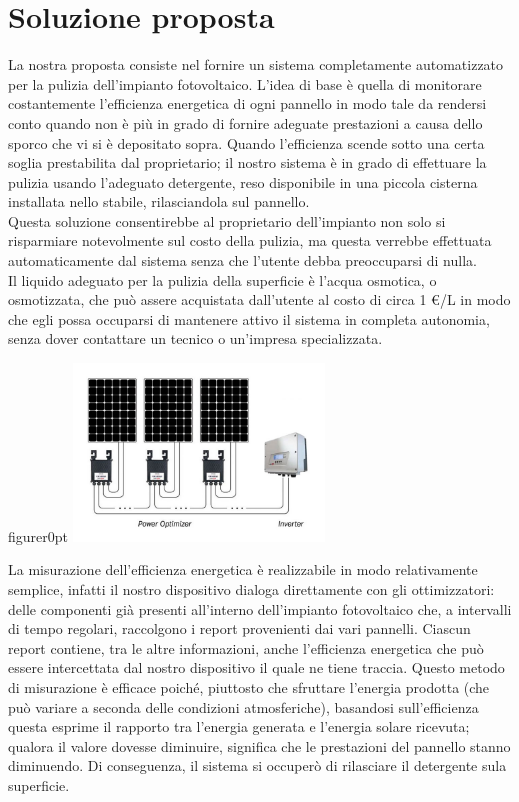 \documentclass[a4paper, 12pt]{article}
\begin{document}
	\section{Soluzione proposta}
	La nostra proposta consiste nel fornire un sistema completamente automatizzato per la pulizia dell'impianto fotovoltaico. L'idea di base è quella di monitorare costantemente l'efficienza energetica di ogni pannello in modo tale da rendersi conto quando non è più in grado di fornire adeguate prestazioni a causa dello sporco che vi si è depositato sopra. Quando l'efficienza scende sotto una certa soglia prestabilita dal proprietario; il nostro sistema è in grado di effettuare la pulizia usando l'adeguato detergente, reso disponibile in una piccola cisterna installata nello stabile, rilasciandola sul pannello.\\
	Questa soluzione consentirebbe al proprietario dell'impianto non solo si risparmiare notevolmente sul costo della pulizia, ma questa verrebbe effettuata automaticamente dal sistema senza che l'utente debba preoccuparsi di nulla.\\
	Il liquido adeguato per la pulizia della superficie è l'acqua osmotica, o osmotizzata, che può assere acquistata dall'utente al costo di circa 1 \euro/L in modo che egli possa occuparsi di mantenere attivo il sistema in completa autonomia, senza dover contattare un tecnico o un'impresa specializzata.\\
	\begin{wrapfloat}{figure}{r}{0pt}
		\includegraphics[width=0.5\textwidth]{Images/ottimizzatori.jpg}
	\end{wrapfloat}
	La misurazione dell'efficienza energetica è realizzabile in modo relativamente semplice, infatti il nostro dispositivo dialoga direttamente con gli ottimizzatori: delle componenti già presenti all'interno dell'impianto fotovoltaico che, a intervalli di tempo regolari, raccolgono i report provenienti dai vari pannelli. Ciascun report contiene, tra le altre informazioni, anche l'efficienza energetica che può essere intercettata dal nostro dispositivo il quale ne tiene traccia. Questo metodo di misurazione è efficace poiché, piuttosto che sfruttare l'energia prodotta (che può variare a seconda delle condizioni atmosferiche), basandosi sull'efficienza questa esprime il rapporto tra l'energia generata e l'energia solare ricevuta; qualora il valore dovesse diminuire, significa che le prestazioni del pannello stanno diminuendo. Di conseguenza, il sistema si occuperò di rilasciare il detergente sula superficie.
\end{document}

